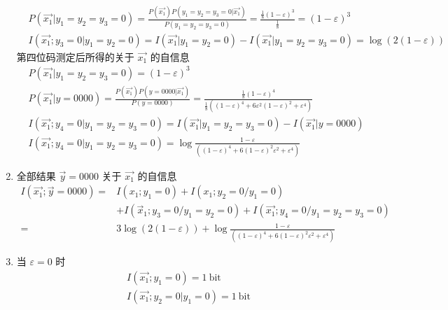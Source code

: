 \begin{remark}
\begin{solution}
\begin{enumerate}
\begin{align*}
                &P(\overrightarrow{x_1} | y_1 = y_2 = y_3 = 0) = \frac{P(\overrightarrow{x_1})P(y_1 = y_2 = y_3 = 0 | \overrightarrow{x_1})}{P(y_1 = y_2 = y_3 = 0)} = \frac{\frac{1}{8} (1 - \varepsilon)^3}{\frac{1}{8}} = (1 - \varepsilon)^3\\
                &I(\overrightarrow{x_1}; y_3 = 0 | y_1 = y_2 = 0) = I(\overrightarrow{x_1} | y_1 = y_2 = 0) - I(\overrightarrow{x_1} | y_1 = y_2 = y_3 = 0) = \log(2(1 - \varepsilon))
            \end{align*}
            第四位码测定后所得的关于 $\vec{x_1}$ 的自信息
            \begin{align*}
                &P(\overrightarrow{x_1} | y_1 = y_2 = y_3 = 0) = (1 - \varepsilon)^3\\
                &P(\overrightarrow{x_1} | y = 0000) = \frac{P(\overrightarrow{x_1}) P(y = 0000 | \overrightarrow{x_1})}{P(y = 0000)} = \frac{\frac{1}{8} (1 - \varepsilon)^4}{\frac{1}{8}((1 - \varepsilon)^4 + 6\varepsilon^2 (1 - \varepsilon)^2 + \varepsilon^4)}\\
                &I(\overrightarrow{x_1} ; y_4 = 0 | y_1 = y_2 = y_3 = 0) = I(\overrightarrow{x_1} | y_1 = y_2 = y_3 = 0) - I(\overrightarrow{x_1} | y = 0000)\\
                &I(\overrightarrow{x_1} ; y_4 = 0 | y_1 = y_2 = y_3 = 0) = \log\frac{1 - \varepsilon}{((1 - \varepsilon)^4 + 6(1 - \varepsilon)^2\varepsilon^2 + \varepsilon^4)}
            \end{align*}
            \item 全部结果 $\vec{y} = 0000$ 关于 $\vec{x_1}$ 的自信息
            \begin{align*}
                I(\overrightarrow{x_1};\overrightarrow{y} = 0000) =& I\left(x_{1} ; y_{1}=0\right)+I\left(x_{1} ; y_{2}=0 / y_{1}=0\right) \\
                &+I\left(\vec{x}_{1} ; y_{3}=0 / y_{1}=y_{2}=0\right)+I\left(\overrightarrow{x_{1}} ; y_{4}=0 / y_{1}=y_{2}=y_{3}=0\right)\\
                =& 3\log(2(1 - \varepsilon)) + \log\frac{1 - \varepsilon}{((1 - \varepsilon)^4 + 6(1 - \varepsilon)^2\varepsilon^2 + \varepsilon^4)}
            \end{align*}
            \item 当 $\varepsilon = 0$ 时
            \begin{align*}
                &I(\overrightarrow{x_1}; y_1 = 0) = \SI{1}{\mathrm{bit}}\\
                &I(\overrightarrow{x_1}; y_2 = 0 | y_1 = 0) = \SI{1}{\mathrm{bit}}\\

\end{align*}
\end{enumerate}
\end{solution}
\end{remark}
